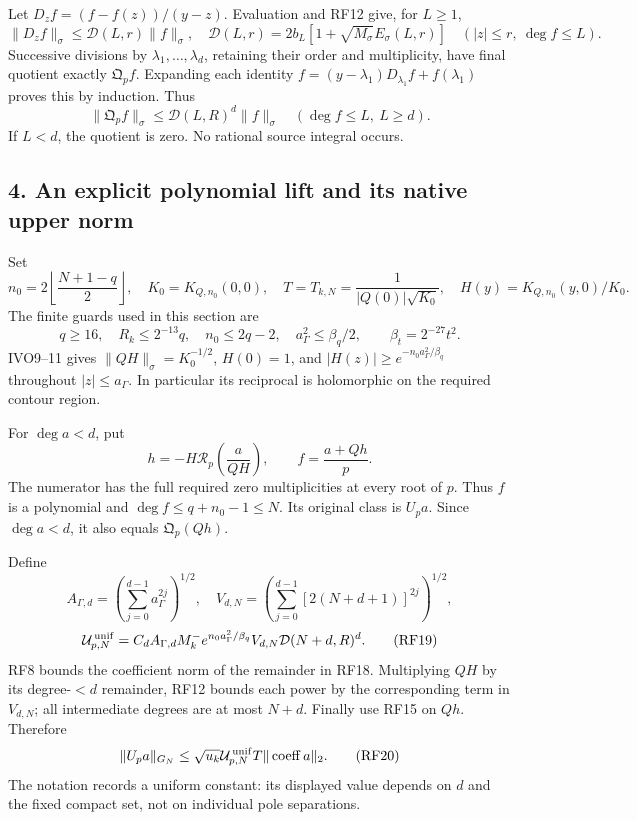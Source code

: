 \documentclass[11pt]{article}
\begin{document}
Let \(D_zf=(f-f(z))/(y-z)\). Evaluation and RF12 give, for \(L\ge1\), \[
\|D_zf\|_\sigma\le
\mathcal D(L,r)\|f\|_\sigma,\quad
\mathcal D(L,r)=2b_L[1+\sqrt{M_\sigma}E_\sigma(L,r)]
\quad(|z|\le r,\ \deg f\le L).
\tag{RF14}
\] Successive divisions by \(\lambda_1,\ldots,\lambda_d\), retaining their order and multiplicity, have final quotient exactly \(\mathfrak Q_pf\). Expanding each identity \(f=(y-\lambda_1)D_{\lambda_1}f+f(\lambda_1)\) proves this by induction. Thus \[
\|\mathfrak Q_pf\|_\sigma\le\mathcal D(L,R)^d\|f\|_\sigma
\quad(\deg f\le L,\ L\ge d).
\tag{RF15}
\] If \(L<d\), the quotient is zero. No rational source integral occurs.

\subsection{4. An explicit polynomial lift and its native upper norm}\label{an-explicit-polynomial-lift-and-its-native-upper-norm}

Set \[
n_0=2\left\lfloor\frac{N+1-q}{2}\right\rfloor,\quad
K_0=K_{Q,n_0}(0,0),\quad T=T_{k,N}=\frac1{|Q(0)|\sqrt{K_0}},
\quad H(y)=K_{Q,n_0}(y,0)/K_0.
\tag{RF16}
\] The finite guards used in this section are \[
q\ge16,\quad R_k\le2^{-13}q,\quad n_0\le2q-2,\quad
a_\Gamma^2\le\beta_q/2,\qquad \beta_t=2^{-27}t^2.
\tag{RF17}
\] IVO9--11 gives \(\|QH\|_\sigma=K_0^{-1/2}\), \(H(0)=1\), and \(|H(z)|\ge e^{-n_0a_\Gamma^2/\beta_q}\) throughout \(|z|\le a_\Gamma\). In particular its reciprocal is holomorphic on the required contour region.

For \(\deg a<d\), put \[
h=-H\mathcal R_p\!\left(\frac a{QH}\right),\qquad
f=\frac{a+Qh}{p}.
\tag{RF18}
\] The numerator has the full required zero multiplicities at every root of \(p\). Thus \(f\) is a polynomial and \(\deg f\le q+n_0-1\le N\). Its original class is \(U_pa\). Since \(\deg a<d\), it also equals \(\mathfrak Q_p(Qh)\).

Define \[
A_{\Gamma,d}=\left(\sum_{j=0}^{d-1}a_\Gamma^{2j}\right)^{1/2},\quad
V_{d,N}=\left(\sum_{j=0}^{d-1}[2(N+d+1)]^{2j}\right)^{1/2},
\] \[
\mathcal U_{p,N}^{\,\rm unif}
=C_dA_{\Gamma,d}M_k^-e^{n_0a_\Gamma^2/\beta_q}
 V_{d,N}\mathcal D(N+d,R)^d.
\tag{RF19}
\] RF8 bounds the coefficient norm of the remainder in RF18. Multiplying \(QH\) by its degree-\(<d\) remainder, RF12 bounds each power by the corresponding term in \(V_{d,N}\); all intermediate degrees are at most \(N+d\). Finally use RF15 on \(Qh\). Therefore \[
\|U_pa\|_{G_N}\le
\sqrt{u_k}\mathcal U_{p,N}^{\,\rm unif}T\|\operatorname{coeff}a\|_2 .
\tag{RF20}
\] The notation records a uniform constant: its displayed value depends on \(d\) and the fixed compact set, not on individual pole separations.
\end{document}
